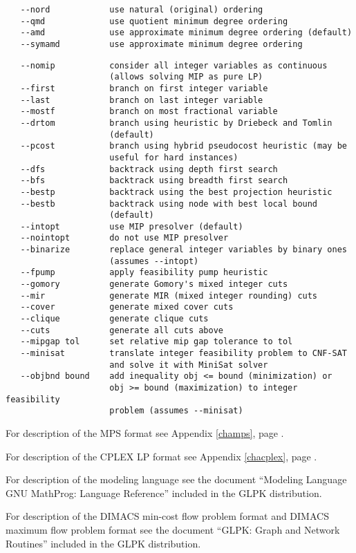 
\begin{verbatim}
   --nord            use natural (original) ordering
   --qmd             use quotient minimum degree ordering
   --amd             use approximate minimum degree ordering (default)
   --symamd          use approximate minimum degree ordering
\end{verbatim}


\begin{verbatim}
   --nomip           consider all integer variables as continuous
                     (allows solving MIP as pure LP)
   --first           branch on first integer variable
   --last            branch on last integer variable
   --mostf           branch on most fractional variable
   --drtom           branch using heuristic by Driebeck and Tomlin
                     (default)
   --pcost           branch using hybrid pseudocost heuristic (may be
                     useful for hard instances)
   --dfs             backtrack using depth first search
   --bfs             backtrack using breadth first search
   --bestp           backtrack using the best projection heuristic
   --bestb           backtrack using node with best local bound
                     (default)
   --intopt          use MIP presolver (default)
   --nointopt        do not use MIP presolver
   --binarize        replace general integer variables by binary ones
                     (assumes --intopt)
   --fpump           apply feasibility pump heuristic
   --gomory          generate Gomory's mixed integer cuts
   --mir             generate MIR (mixed integer rounding) cuts
   --cover           generate mixed cover cuts
   --clique          generate clique cuts
   --cuts            generate all cuts above
   --mipgap tol      set relative mip gap tolerance to tol
   --minisat         translate integer feasibility problem to CNF-SAT
                     and solve it with MiniSat solver
   --objbnd bound    add inequality obj <= bound (minimization) or
                     obj >= bound (maximization) to integer feasibility
                     problem (assumes --minisat)
\end{verbatim}

\newpage

For description of the MPS format see Appendix \ref{champs}, page
\pageref{champs}.

For description of the CPLEX LP format see Appendix \ref{chacplex},
page \pageref{chacplex}.

For description of the modeling language see the document ``Modeling
Language GNU MathProg: Language Reference'' included in the GLPK
distribution.

For description of the DIMACS min-cost flow problem format and DIMACS
maximum flow problem format see the document ``GLPK: Graph and Network
Routines'' included in the GLPK distribution.

